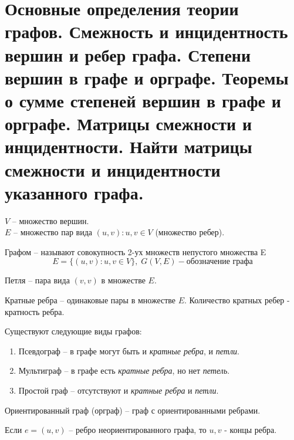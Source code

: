 \section{Основные определения теории графов. Смежность и инцидентность вершин и ребер графа. 
Степени вершин в графе и орграфе. Теоремы о сумме степеней вершин в графе и орграфе. 
Матрицы смежности и инцидентности. Найти матрицы смежности и инцидентности указанного 
графа.}

$V$ -- множество вершин. \\
$E$ -- множество пар вида $(u, v): u, v \in V$ (множество ребер).

\begin{definition}
    Графом -- называют совокупность 2-ух множеств непустого множества E
	\begin{equation*}
		E = \{(u, v): u, v \in V\}, \; G(V, E) - \textit{обозначение графа}
	\end{equation*}
\end{definition}

\begin{definition}
    Петля -- пара вида $(v,v)$ в множестве $E$.
\end{definition}

\begin{definition}
    Кратные ребра -- одинаковые пары в множестве $E$. Количество кратных ребер - кратность ребра.
\end{definition}

\noindent
Существуют следующие виды графов:
\begin{enumerate}[left=0.0em, labelsep=1em, topsep=0.0em, itemsep=0pt, parsep=0.5em]
    \item Псевдограф -- в графе могут быть и \textit{кратные ребра}, и \textit{петли}.
    \item Мультиграф -- в графе есть \textit{кратные ребра}, но нет \textit{петель}.
    \item Простой граф -- отсутствуют и \textit{кратные ребра} и \textit{петли}.
\end{enumerate}

\begin{definition}
    Ориентированный граф (орграф) -- граф с ориентированными ребрами.
\end{definition}

\begin{definition}
    Если $e=(u,v)$ -- ребро неориентированного графа, то $u, v$ - концы ребра.
\end{definition}

